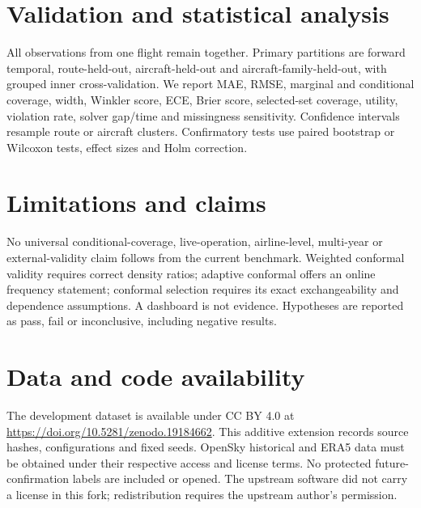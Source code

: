 \documentclass[11pt]{article}
\begin{document}
\begin{table}[ht]
\centering
\caption{Refit metadata feature-group ablations on the exploratory October set.}

\end{table}

\section{Validation and statistical analysis}
All observations from one flight remain together. Primary partitions are
forward temporal, route-held-out, aircraft-held-out and aircraft-family-held-out,
with grouped inner cross-validation. We report MAE, RMSE, marginal and
conditional coverage, width, Winkler score, ECE, Brier score, selected-set
coverage, utility, violation rate, solver gap/time and missingness sensitivity.
Confidence intervals resample route or aircraft clusters. Confirmatory tests use
paired bootstrap or Wilcoxon tests, effect sizes and Holm correction.

\section{Limitations and claims}
No universal conditional-coverage, live-operation, airline-level, multi-year or
external-validity claim follows from the current benchmark. Weighted conformal
validity requires correct density ratios; adaptive conformal offers an online
frequency statement; conformal selection requires its exact exchangeability and
dependence assumptions. A dashboard is not evidence. Hypotheses are reported as
pass, fail or inconclusive, including negative results.

\section{Data and code availability}
The development dataset is available under CC BY 4.0 at
\url{https://doi.org/10.5281/zenodo.19184662}. This additive extension records
source hashes, configurations and fixed seeds. OpenSky historical and ERA5 data
must be obtained under their respective access and license terms. No protected
future-confirmation labels are included or opened. The upstream software did not
carry a license in this fork; redistribution requires the upstream author's
permission.
\end{document}
